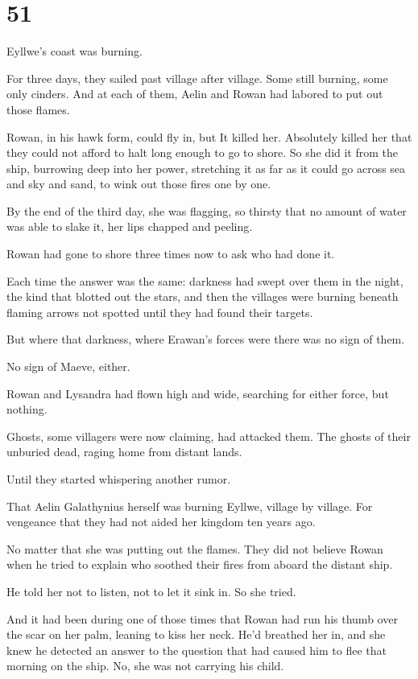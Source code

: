 
\chapter{51}

Eyllwe's coast was burning.

For three days, they sailed past village after village. Some still burning, some only cinders. And at each of them, Aelin and Rowan had labored to put out those flames.

Rowan, in his hawk form, could fly in, but  It killed her. Absolutely killed her that they could not afford to halt long enough to go to shore. So she did it from the ship, burrowing deep into her power, stretching it as far as it could go across sea and sky and sand, to wink out those fires one by one.

By the end of the third day, she was flagging, so thirsty that no amount of water was able to slake it, her lips chapped and peeling.

Rowan had gone to shore three times now to ask who had done it.

Each time the answer was the same: darkness had swept over them in the night, the kind that blotted out the stars, and then the villages were burning beneath flaming arrows not spotted until they had found their targets.

But where that darkness, where Erawan's forces were  there was no sign of them.

No sign of Maeve, either.

Rowan and Lysandra had flown high and wide, searching for either force, but  nothing.

Ghosts, some villagers were now claiming, had attacked them. The ghosts of their unburied dead, raging home from distant lands.

Until they started whispering another rumor.

That Aelin Galathynius herself was burning Eyllwe, village by village. For vengeance that they had not aided her kingdom ten years ago.

No matter that she was putting out the flames. They did not believe Rowan when he tried to explain who soothed their fires from aboard the distant ship.

He told her not to listen, not to let it sink in. So she tried.

And it had been during one of those times that Rowan had run his thumb over the scar on her palm, leaning to kiss her neck. He'd breathed her in, and she knew he detected an answer to the question that had caused him to flee that morning on the ship. No, she was not carrying his child.

